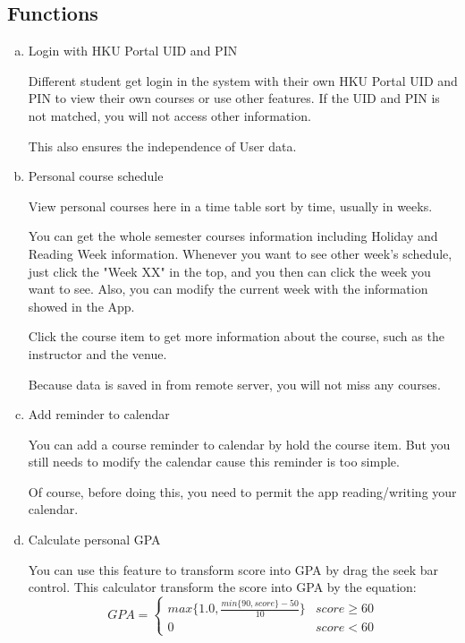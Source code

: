 \documentclass{article}
\begin{document}
    \subsection{Functions}
    \begin{enumerate}[a)]
    \item Login with HKU Portal UID and PIN
    
    Different student get login in the system with their own HKU
    Portal UID and PIN to view their own courses or use other features. 
    If the UID and PIN is not matched, you will not access other 
    information.

    This also ensures the independence of User data.
    
    \item Personal course schedule
    
    View personal courses here in a time table sort by time, 
    usually in weeks. 

    You can get the whole semester courses information 
    including Holiday and Reading Week information. 
    Whenever you want to see other week's schedule, just click 
    the "Week XX" in the top, and you then can click the week you 
    want to see. Also, you can modify the current week with the 
    information showed in the App.

    Click the course item to get more information about the course,
    such as the instructor and the venue. 
    
    Because data is saved in from remote server, 
    you will not miss any courses.

    \item Add reminder to calendar
    
    You can add a course reminder to calendar 
    by hold the course item. 
    But you still needs to modify the calendar 
    cause this reminder is too simple.
    
    Of course, before doing this,
    you need to permit the app reading/writing your calendar.

    \item Calculate personal GPA
    
    You can use this feature to transform score into 
    GPA by drag the seek bar control.
    This calculator transform the score into GPA by the equation:
    $$GPA =
    \begin{cases}
        max\{1.0, \frac{min\{90, score\} - 50}{10} \} & {score \geq  60}\\
        0 & {score < 60}
    \end{cases}$$


\end{enumerate}
\end{document}
